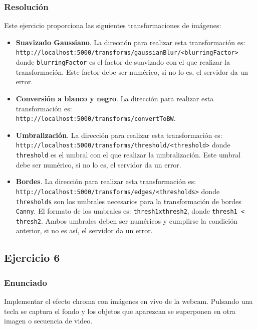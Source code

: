 \documentclass[a4paper,10pt,titlepage,oneside,openright]{book}
\begin{document}
\subsubsection*{Resolución}
Este ejercicio proporciona las siguientes transformaciones de imágenes:
\begin{itemize}
 \item \textbf{Suavizado Gaussiano}. La dirección para realizar esta transformación es: \\\texttt{http://localhost:5000/transforms/gaussianBlur/<blurringFactor>} donde \texttt{blurringFactor} es el factor de suavizado con el que realizar la transformación. Este factor debe ser numérico, si no lo es, el servidor da un error.
 \item \textbf{Conversión a blanco y negro}. La dirección para realizar esta transformación es: \\\texttt{http://localhost:5000/transforms/convertToBW}. 
 \item \textbf{Umbralización}. La dirección para realizar esta transformación es: \\\texttt{http://localhost:5000/transforms/threshold/<threshold>} donde \texttt{threshold} es el umbral con el que realizar la umbralización. Este umbral debe ser numérico, si no lo es, el servidor da un error.
 \item \textbf{Bordes}. La dirección para realizar esta transformación es: \\\texttt{http://localhost:5000/transforms/edges/<thresholds>} donde \texttt{thresholds} son los umbrales necesarios para la transformación de bordes \texttt{Canny}. El formato de los umbrales es: \texttt{thresh1xthresh2}, donde \texttt{thresh1 < thresh2}. Ambos umbrales deben ser numéricos y cumplirse la condición anterior, si no es así, el servidor da un error.
\end{itemize}



\medskip
\subsection{Ejercicio 6}

\subsubsection*{Enunciado}
Implementar el efecto chroma con imágenes en vivo de la webcam. Pulsando una tecla se captura el fondo y los objetos que aparezcan se superponen en otra imagen o secuencia de video.
\end{document}

